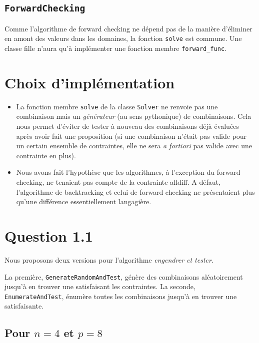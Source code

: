 \documentclass[a4paper, 12pt]{report}
\newcommand{\py}[1]{\texttt{#1}}
\begin{document}
\subsection*{\py{ForwardChecking}}

Comme l'algorithme de forward checking ne dépend pas de la manière d'éliminer en amont des valeurs dans les domaines, la fonction \py{solve} est commune. Une classe fille n'aura qu'à implémenter une fonction membre \py{forward_func}.



\section*{Choix d'implémentation}

\begin{itemize}
	\item La fonction membre \py{solve} de la classe \py{Solver} ne renvoie pas une combinaison mais un \textit{générateur} (au sens pythonique) de combinaisons. Cela nous permet d'éviter de tester à nouveau des combinaisons déjà évaluées après avoir fait une proposition (si une combinaison n'était pas valide pour un certain ensemble de contraintes, elle ne sera \textit{a fortiori} pas valide avec une contrainte en plus).

	\item Nous avons fait l'hypothèse que les algorithmes, à l'exception du forward checking, ne tenaient pas compte de la contrainte alldiff. A défaut, l'algorithme de backtracking et celui de forward checking ne présentaient plus qu'une différence essentiellement langagière.
\end{itemize}



\section*{Question 1.1}

Nous proposons deux versions pour l'algorithme \textit{engendrer et tester}.

La première, \py{GenerateRandomAndTest}, génère des combinaisons aléatoirement jusqu'à en trouver une satisfaisant les contraintes. La seconde, \py{EnumerateAndTest}, énumère toutes les combinaisons jusqu'à en trouver une satisfaisante. \\

\subsection*{Pour $n = 4$ et $p = 8$}
\end{document}
